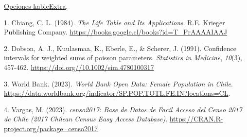 \documentclass[
  10pt,
]{article}
\newlength{\cslhangindent}
\newenvironment{CSLReferences}[2] %
 {\begin{list}{}{%
  \setlength{\itemindent}{0pt}
  \setlength{\leftmargin}{0pt}
  \setlength{\parsep}{0pt}
  \ifodd #1
   \setlength{\leftmargin}{\cslhangindent}
   \setlength{\itemindent}{-1\cslhangindent}
  \fi
  \setlength{\itemsep}{#2\baselineskip}}}
 {\end{list}}
\begin{document}
\href{https://cran.r-project.org/web/packages/kableExtra/vignettes/awesome_table_in_html.html}{Opciones
kableExtra}.

\label{refs}
\begin{CSLReferences}{1}{0}
1. Chiang, C. L. (1984). \emph{The Life Table and Its Applications}.
R.E. Krieger Publishing Company.
\url{https://books.google.cl/books?id=T_PrAAAAIAAJ}

2. Dobson, A. J., Kuulasmaa, K., Eberle, E., \& Scherer, J. (1991).
Confidence intervals for weighted sums of poisson parameters.
\emph{Statistics in Medicine}, \emph{10}(3), 457-462.
\url{https://doi.org//10.1002/sim.4780100317}

3. World Bank. (2023). \emph{{World Bank Open Data: Female Population in
Chile}}.
\url{https://data.worldbank.org/indicator/SP.POP.TOTL.FE.IN?locations=CL}.

4. Vargas, M. (2023). \emph{censo2017: Base de Datos de Facil Acceso del
Censo 2017 de Chile (2017 Chilean Census Easy Access Database)}.
\url{https://CRAN.R-project.org/package=censo2017}

\end{CSLReferences}
\end{document}
